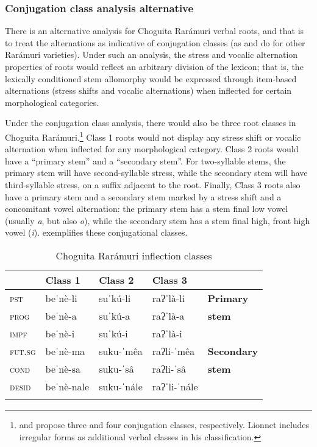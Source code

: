 \subsubsection{Conjugation class analysis alternative}
\label{subsubsec: conjugation class analysis alternative}

There is an alternative analysis for Choguita Rarámuri verbal roots, and that is to treat the alternations as indicative of conjugation classes (as \citealt{brambila1953gramatica} and \citealt{lionnet1972elementos} do for other Rarámuri varieties). Under such an analysis, the stress and vocalic alternation properties of roots would reflect an arbitrary division of the lexicon; that is, the lexically conditioned stem allomorphy would be expressed through item-based alternations (stress shifts and vocalic alternations) when inflected for certain morphological categories.

Under the conjugation class analysis, there would also be three root classes in Choguita Rarámuri.\footnote{\citet{brambila1953gramatica}  and \citet{lionnet1972elementos} propose three and four conjugation classes, respectively. Lionnet includes irregular forms as additional verbal classes in his classification.} Class 1 roots would not display any stress shift or vocalic alternation when inflected for any morphological category. Class 2 roots would have a ``primary stem'' and a ``secondary stem''. For two-syllable stems, the primary stem will have second-syllable stress, while the secondary stem will have third-syllable stress, on a suffix adjacent to the root. Finally, Class 3 roots also have a primary stem and a secondary stem marked by a stress shift and a concomitant vowel alternation: the primary stem has a stem final low vowel (usually \textit{a}, but also \textit{o}), while the secondary stem has a stem final high, front high vowel (\textit{i}).  exemplifies these conjugational classes.

\begin{table}
\caption{Choguita Rarámuri inflection classes}
\label{tab:inflection-classes}

\begin{tabularx}{\textwidth}{XXXXX}
\lsptoprule
& \textbf{Class 1} & \textbf{Class 2}  & \textbf{Class 3} & \\
\midrule
\textsc{pst} &  beˈnè-li  &     suˈkú-li      &   raʔˈlà-li & \textbf{Primary}\\
\textsc{prog} &  beˈnè-a &    suˈkú-a &  raʔˈlà-a    & \textbf{stem}\\
\textsc{impf} &   beˈnè-i &   suˈkú-i  &  raʔˈlà-i &              \\
\tablevspace
\textsc{fut.sg} & beˈnè-ma   &          suku-ˈmêa   &     raʔli-ˈmêa & \textbf{Secondary}\\
\textsc{cond} &  beˈnè-sa & suku-ˈsâ    &  raʔli-ˈsâ &   \textbf{stem}\\
\textsc{desid} &  beˈnè-nale    & suku-ˈnále    &  raʔˈli-ˈnále & \\
\lspbottomrule
\end{tabularx}
\end{table}

